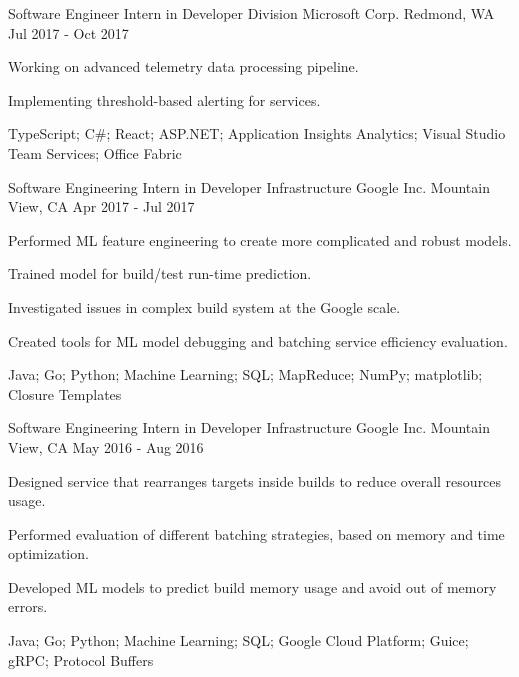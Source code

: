 \begin{cventries}
  \cventry
    {Software Engineer Intern in Developer Division} %
    {Microsoft Corp.} %
    {Redmond, WA} %
    {Jul 2017 - Oct 2017} %
    {
      \begin{cvitems} %
        \item {Working on advanced telemetry data processing pipeline.}
        \item {Implementing threshold-based alerting for services.}
        \item {TypeScript; C\#; React; ASP.NET; Application Insights Analytics; Visual Studio Team Services; Office Fabric}
      \end{cvitems}
    }
  \cventry
    {Software Engineering Intern in Developer Infrastructure} %
    {Google Inc.} %
    {Mountain View, CA} %
    {Apr 2017 - Jul 2017} %
    {
      \begin{cvitems} %
        \item {Performed ML feature engineering to create more complicated and robust models.}
        \item {Trained model for build/test run-time prediction.}
        \item {Investigated issues in complex build system at the Google scale.}
        \item {Created tools for ML model debugging and batching service efficiency evaluation.}
        \item {Java; Go; Python; Machine Learning; SQL; MapReduce; NumPy; matplotlib; Closure Templates}
      \end{cvitems}
    }
  \cventry
    {Software Engineering Intern in Developer Infrastructure} %
    {Google Inc.} %
    {Mountain View, CA} %
    {May 2016 - Aug 2016} %
    {
      \begin{cvitems} %
        \item {Designed service that rearranges targets inside builds to reduce overall resources usage.}
        \item {Performed evaluation of different batching strategies, based on memory and time optimization.}
        \item {Developed ML models to predict build memory usage and avoid out of memory errors.}
        \item {Java; Go; Python; Machine Learning; SQL; Google Cloud Platform; Guice; gRPC; Protocol Buffers}
      \end{cvitems}
    }
\end{cventries}
